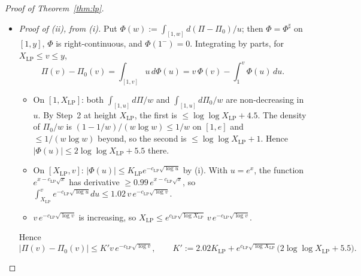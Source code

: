 \begin{proof}[Proof of Theorem~\ref{thm:lp}]
\begin{itemize}
  $\log(3T_1/a)\le2.02\sqrt{\log v}$. So the shifted line gives at most
  \[
    \pi^{-1}eC_m\cdot1633\log v\cdot e^{-2.2c_{\mathrm{LP}}\sqrt{\log v}}\le e^{82.2}\cdot1633\cdot1214\Lambda^2e^{-c_{\mathrm{LP}}\sqrt{\log v}}
    \le e^{96.7}\Lambda^2e^{-c_{\mathrm{LP}}\sqrt{\log v}},
  \]
  since $\pi^{-1}eC_m\le e^{82.2}$ and $\max_{s>0}s^2e^{-1.2c_{\mathrm{LP}}s}=0.376/c_{\mathrm{LP}}^2\le1214\Lambda^2$. The other pieces and the smoothing
  error add at most $e^{-\sqrt{\log v}}+6/T+3v^{\theta'-1}\le8e^{-c_{\mathrm{LP}}\sqrt{\log v}}$. Together this gives (i) with
  $c_{\mathrm{LP}}=c_{\mathrm{zf}}/5$ and the constant $K_{\mathrm{LP}}:=e^{97}\Lambda^2$.
\item \emph{Proof of (ii), from (i).} Put $\Phi(w):=\int_{[1,w]}d(\Pi-\Pi_0)/u$; then $\Phi=\Phi^\sharp$ on $[1,y]$, $\Phi$ is
  right-continuous, and $\Phi(1^-)=0$. Integrating by parts, for $X_{\mathrm{LP}}\le v\le y$,
  \[
    \Pi(v)-\Pi_0(v)=\int_{[1,v]}u\,d\Phi(u)=v\,\Phi(v)-\int_1^v\Phi(u)\,du .
  \]
  \begin{itemize}
  \item On $[1,X_{\mathrm{LP}}]$: both $\int_{[1,u]}d\Pi/w$ and $\int_{[1,u]}d\Pi_0/w$ are non-decreasing in $u$. By Step~2 at
    height $X_{\mathrm{LP}}$, the first is $\le\log\log X_{\mathrm{LP}}+4.5$. The density of $\Pi_0/w$ is
    $(1-1/w)/(w\log w)\le1/w$ on $[1,e]$ and $\le1/(w\log w)$ beyond, so the second is $\le\log\log X_{\mathrm{LP}}+1$. Hence
    $|\Phi(u)|\le2\log\log X_{\mathrm{LP}}+5.5$ there.
  \item On $[X_{\mathrm{LP}},v]$: $|\Phi(u)|\le K_{\mathrm{LP}}e^{-c_{\mathrm{LP}}\sqrt{\log u}}$ by (i). With $u=e^x$, the function
    $e^{x-c_{\mathrm{LP}}\sqrt x}$ has derivative $\ge0.99\,e^{x-c_{\mathrm{LP}}\sqrt x}$, so
    $\int_{X_{\mathrm{LP}}}^ve^{-c_{\mathrm{LP}}\sqrt{\log u}}du\le1.02\,v\,e^{-c_{\mathrm{LP}}\sqrt{\log v}}$.
  \item $v\,e^{-c_{\mathrm{LP}}\sqrt{\log v}}$ is increasing, so
    $X_{\mathrm{LP}}\le e^{c_{\mathrm{LP}}\sqrt{\log X_{\mathrm{LP}}}}\,v\,e^{-c_{\mathrm{LP}}\sqrt{\log v}}$.
  \end{itemize}
  Hence
  \[
    |\Pi(v)-\Pi_0(v)|\le K'v\,e^{-c_{\mathrm{LP}}\sqrt{\log v}},\qquad
    K':=2.02K_{\mathrm{LP}}+e^{c_{\mathrm{LP}}\sqrt{\log X_{\mathrm{LP}}}}\big(2\log\log X_{\mathrm{LP}}+5.5\big).
\]
\end{itemize}
\end{proof}

